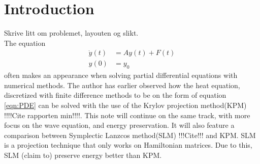 \chapter{Introduction}
Skrive litt om problemet, layouten og slikt. \\
The equation 
\begin{equation} \label{eqn:PDE}
\begin{aligned}
\dot{y}(t) &= Ay(t) + F(t) \\
y(0)&= y_0
\end{aligned}
\end{equation}
often makes an appearance when solving partial differential equations with numerical methods. The author has earlier observed how the heat equation, discretized with finite difference methods to be on the form of equation \eqref{eqn:PDE} can be solved with the use of the Krylov projection method(KPM) !!!!Cite rapporten min!!!!. This note will continue on the same track, with more focus on the wave equation, and energy preservation. It will also feature a comparison between Symplectic Lanzcos method(SLM) !!!Cite!!! and KPM. SLM is a projection technique that only works on Hamiltonian matrices. Due to this, SLM (claim to) preserve energy better than KPM.  %

